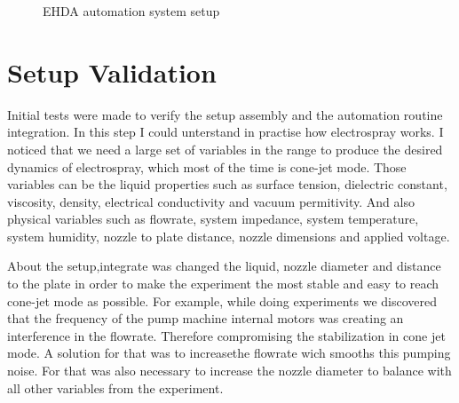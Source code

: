 
\begin{figure}[H]
  \centering
  \caption{EHDA automation system setup}
  \label{fig:setup}
\end{figure}


\section{Setup Validation}
\label{sec:setup_validation}

Initial tests were made to verify the setup assembly and the automation routine integration. In this step I could unterstand in practise how electrospray works.
I noticed that we need a large set of variables in the range to produce the desired dynamics of electrospray, which most of the time is cone-jet mode.
 Those variables can be the liquid properties such as surface tension, dielectric constant, viscosity, density, electrical conductivity and vacuum permitivity. 
 And also physical variables such as flowrate, system impedance, system temperature, system humidity, nozzle to plate distance, nozzle dimensions and applied voltage.


 About the setup,integrate was changed the liquid, nozzle diameter and distance to the plate in order to
make the experiment the most stable and easy to reach cone-jet mode as possible. For example, while doing experiments we discovered that the frequency of the pump machine internal motors was creating an interference in the flowrate. Therefore compromising the stabilization in cone jet mode. A solution for that was to increasethe flowrate wich smooths this pumping noise. For that was also necessary to increase the nozzle diameter to balance with all other variables from the experiment.


\clearpage
